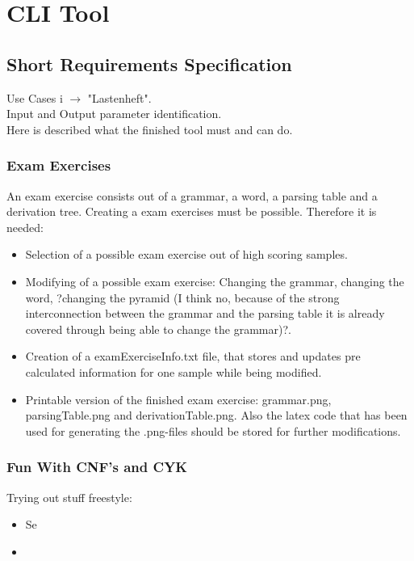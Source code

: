 
\section{CLI Tool}

\subsection{Short Requirements Specification}
Use Cases i $\longrightarrow$ "Lastenheft".\\
Input and Output parameter identification.\\
Here is described what the finished tool must and can do.\\

\subsubsection{Exam Exercises}
An exam exercise consists out of a grammar, a word, a parsing table and a derivation tree. Creating a exam exercises must be possible. Therefore it is needed:
\begin{itemize}
	\item Selection of a possible exam exercise out of high scoring samples.
	\item Modifying of a possible exam exercise: Changing the grammar, changing the word, ?changing the pyramid (I think no, because of the strong interconnection between the grammar and the parsing table it is already covered through being able to change the grammar)?.
	\item Creation of a examExerciseInfo.txt file, that stores and updates pre calculated information for one sample while being modified. 
	\item Printable version of the finished exam exercise: grammar.png, parsingTable.png and derivationTable.png. Also the latex code that has been used for generating the .png-files should be stored for further modifications.
\end{itemize}

\subsubsection{Fun With CNF's and CYK}
Trying out stuff freestyle:
\begin{itemize}
	\item Se
	\item 
\end{itemize}

